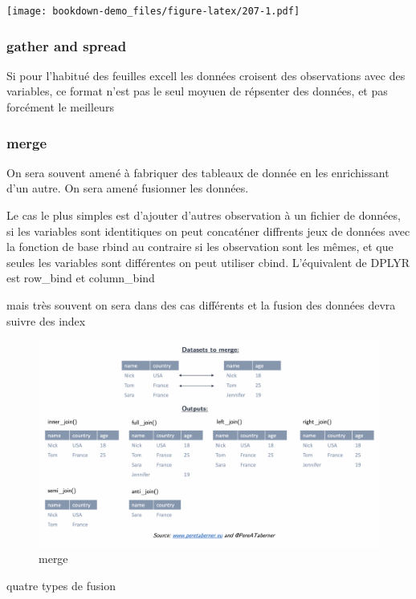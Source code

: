 \documentclass[
]{book}
\begin{document}
\texttt{[image: bookdown-demo\_files/figure-latex/207-1.pdf]}

\hypertarget{gather-and-spread}{%
\subsubsection{gather and spread}\label{gather-and-spread}}

Si pour l'habitué des feuilles excell les données croisent des observations avec des variables, ce format n'est pas le seul moyuen de répsenter des données, et pas forcément le meilleurs

\hypertarget{merge}{%
\subsubsection{merge}\label{merge}}

On sera souvent amené à fabriquer des tableaux de donnée en les enrichissant d'un autre. On sera amené fusionner les données.

Le cas le plus simples est d'ajouter d'autres observation à un fichier de données, si les variables sont identitiques on peut concaténer diffrents jeux de données avec la fonction de base rbind au contraire si les observation sont les mêmes, et que seules les variables sont différentes on peut utiliser cbind. L'équivalent de DPLYR est row\_bind et column\_bind

mais très souvent on sera dans des cas différents et la fusion des données devra suivre des index

\begin{figure}
\centering
\includegraphics{./Images/merge_ex-1024x624.png}
\caption{merge}
\end{figure}

quatre types de fusion
\end{document}
